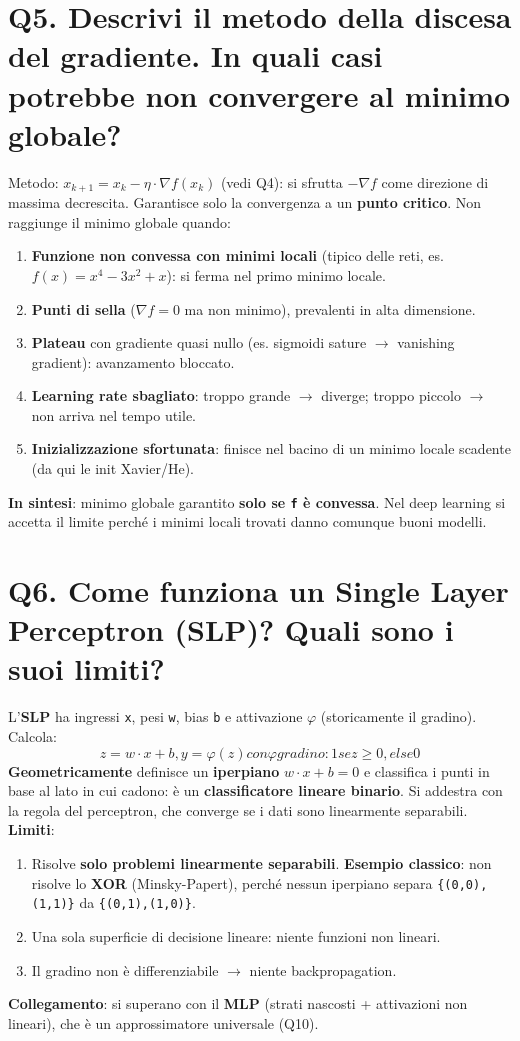 \documentclass[11pt,a4paper]{article}
\begin{document}
\section*{Q5. Descrivi il metodo della discesa del gradiente. In quali casi potrebbe non convergere al minimo globale?}
Metodo: $x_{k+1} = x_{k} - \eta \cdot \nabla f(x_{k})$ (vedi Q4): si sfrutta $-\nabla f$ come direzione di massima decrescita.
Garantisce solo la convergenza a un \textbf{punto critico}. Non raggiunge il minimo globale quando:
\begin{enumerate}
\item \textbf{Funzione non convessa con minimi locali} (tipico delle reti, es. $f(x)=x^{4}-3x^{2}+x$): si ferma nel primo minimo locale.
\item \textbf{Punti di sella} ($\nabla f=0$ ma non minimo), prevalenti in alta dimensione.
\item \textbf{Plateau} con gradiente quasi nullo (es. sigmoidi sature $\to $ vanishing gradient): avanzamento bloccato.
\item \textbf{Learning rate sbagliato}: troppo grande $\to $ diverge; troppo piccolo $\to $ non arriva nel tempo utile.
\item \textbf{Inizializzazione sfortunata}: finisce nel bacino di un minimo locale scadente (da qui le init Xavier/He).
\end{enumerate}
\textbf{In sintesi}: minimo globale garantito \textbf{solo se \texttt{f} è convessa}. Nel deep learning si accetta il limite perché i minimi locali trovati danno comunque buoni modelli.
\newpage
\section*{Q6. Come funziona un Single Layer Perceptron (SLP)? Quali sono i suoi limiti?}
L'\textbf{SLP} ha ingressi \texttt{x}, pesi \texttt{w}, bias \texttt{b} e attivazione $\varphi $ (storicamente il gradino). Calcola:
\[ z = w \cdot  x + b,   y = \varphi (z)     con \varphi  gradino: 1 se z\ge 0, else 0 \]
\textbf{Geometricamente} definisce un \textbf{iperpiano} $w\cdot x + b = 0$ e classifica i punti in base al lato in cui cadono: è un \textbf{classificatore lineare binario}. Si addestra con la regola del perceptron, che converge se i dati sono linearmente separabili.
\textbf{Limiti}:
\begin{enumerate}
\item Risolve \textbf{solo problemi linearmente separabili}. \textbf{Esempio classico}: non risolve lo \textbf{XOR} (Minsky-Papert), perché nessun iperpiano separa \texttt{\{(0,0),(1,1)\}} da \texttt{\{(0,1),(1,0)\}}.
\item Una sola superficie di decisione lineare: niente funzioni non lineari.
\item Il gradino non è differenziabile $\to $ niente backpropagation.
\end{enumerate}
\textbf{Collegamento}: si superano con il \textbf{MLP} (strati nascosti + attivazioni non lineari), che è un approssimatore universale (Q10).
\newpage
\end{document}
